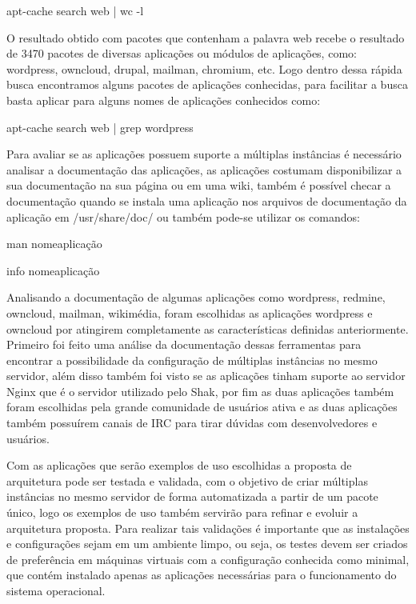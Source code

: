 \begin{center}
apt-cache search web | wc -l
\end{center}

O resultado obtido com pacotes que contenham a palavra web recebe o resultado de 3470
pacotes de diversas aplicações ou módulos de aplicações, como:
wordpress, owncloud, drupal, mailman, chromium, etc. Logo dentro dessa rápida busca
encontramos alguns pacotes de aplicações conhecidas, para facilitar a busca basta
aplicar para alguns nomes de aplicações conhecidos como:

\begin{center}
apt-cache search web | grep wordpress
\end{center}

Para avaliar se as aplicações possuem suporte a múltiplas instâncias é necessário
analisar a documentação das aplicações, as aplicações costumam disponibilizar a sua
documentação na sua página ou em uma wiki, também é possível checar a documentação
quando se instala uma aplicação nos arquivos de documentação da aplicação em
/usr/share/doc/ ou também pode-se utilizar os comandos:

\begin{center}
man nomeaplicação

info nomeaplicação
\end{center}

Analisando a documentação de algumas aplicações como wordpress, redmine,
owncloud, mailman, wikimédia, foram escolhidas as aplicações wordpress e owncloud por
atingirem completamente as características definidas anteriormente. Primeiro
foi feito uma análise da documentação dessas ferramentas para encontrar a
possibilidade da configuração de múltiplas instâncias no mesmo servidor, além
disso também foi visto se as aplicações tinham suporte ao servidor Nginx que é
o servidor utilizado pelo Shak, por fim as duas aplicações também foram escolhidas
pela grande comunidade de usuários ativa e as duas aplicações também possuírem
canais de IRC para tirar dúvidas com desenvolvedores e usuários.

Com as aplicações que serão exemplos de uso escolhidas a proposta de arquitetura
pode ser testada e validada, com o objetivo de criar múltiplas instâncias
no mesmo servidor de forma automatizada a partir de um pacote único, logo os
exemplos de uso também servirão para refinar e evoluir a arquitetura proposta.
Para realizar tais validações é importante que as instalações e configurações
sejam em um ambiente limpo, ou seja, os testes devem ser criados de preferência
em máquinas virtuais com a configuração conhecida como minimal, que contém
instalado apenas as aplicações necessárias para o funcionamento do sistema operacional.

